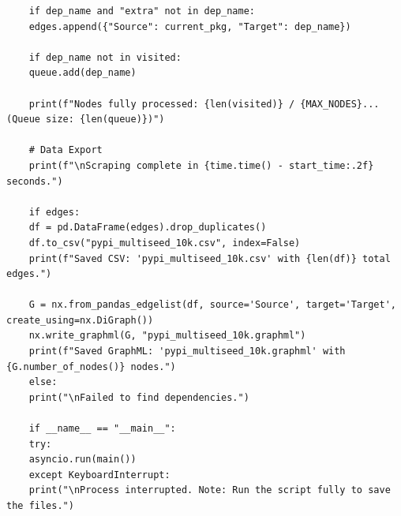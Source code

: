 \documentclass[12pt,a4paper]{article}
\begin{document}
\begin{lstlisting}
	if dep_name and "extra" not in dep_name:
	edges.append({"Source": current_pkg, "Target": dep_name})
	
	if dep_name not in visited:
	queue.add(dep_name)
	
	print(f"Nodes fully processed: {len(visited)} / {MAX_NODES}... (Queue size: {len(queue)})")
	
	# Data Export
	print(f"\nScraping complete in {time.time() - start_time:.2f} seconds.")
	
	if edges:
	df = pd.DataFrame(edges).drop_duplicates()
	df.to_csv("pypi_multiseed_10k.csv", index=False)
	print(f"Saved CSV: 'pypi_multiseed_10k.csv' with {len(df)} total edges.")
	
	G = nx.from_pandas_edgelist(df, source='Source', target='Target', create_using=nx.DiGraph())
	nx.write_graphml(G, "pypi_multiseed_10k.graphml")
	print(f"Saved GraphML: 'pypi_multiseed_10k.graphml' with {G.number_of_nodes()} nodes.")
	else:
	print("\nFailed to find dependencies.")
	
	if __name__ == "__main__":
	try:
	asyncio.run(main())
	except KeyboardInterrupt:
	print("\nProcess interrupted. Note: Run the script fully to save the files.")
\end{lstlisting}
\end{document}
